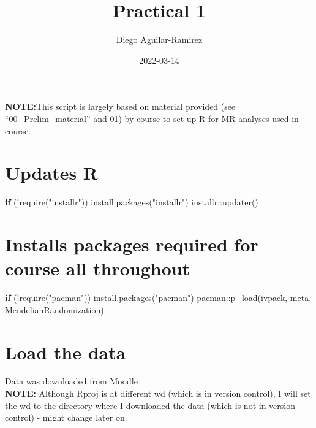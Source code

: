 \documentclass[
]{article}
\title{Practical 1}
\author{Diego Aguilar-Ramirez}
\date{2022-03-14}
\newenvironment{Shaded}{\begin{snugshade}}{\end{snugshade}}
\newcommand{\ControlFlowTok}[1]{\textcolor[rgb]{0.13,0.29,0.53}{\textbf{#1}}}
\newcommand{\FunctionTok}[1]{\textcolor[rgb]{0.00,0.00,0.00}{#1}}
\newcommand{\NormalTok}[1]{#1}
\newcommand{\SpecialCharTok}[1]{\textcolor[rgb]{0.00,0.00,0.00}{#1}}
\newcommand{\StringTok}[1]{\textcolor[rgb]{0.31,0.60,0.02}{#1}}
\begin{document}
\maketitle

\textbf{NOTE:}This script is largely based on material provided (see
``00\_Prelim\_material'' and 01) by course to set up R for MR analyses
used in course.

\hypertarget{updates-r}{%
\section{Updates R}\label{updates-r}}

\begin{Shaded}
\begin{Highlighting}[]
\ControlFlowTok{if}\NormalTok{ (}\SpecialCharTok{!}\FunctionTok{require}\NormalTok{(}\StringTok{"installr"}\NormalTok{)) }\FunctionTok{install.packages}\NormalTok{(}\StringTok{"installr"}\NormalTok{)}
\NormalTok{installr}\SpecialCharTok{::}\FunctionTok{updater}\NormalTok{()}
\end{Highlighting}
\end{Shaded}

\hypertarget{installs-packages-required-for-course-all-throughout}{%
\section{Installs packages required for course all
throughout}\label{installs-packages-required-for-course-all-throughout}}

\begin{Shaded}
\begin{Highlighting}[]
\ControlFlowTok{if}\NormalTok{ (}\SpecialCharTok{!}\FunctionTok{require}\NormalTok{(}\StringTok{"pacman"}\NormalTok{)) }\FunctionTok{install.packages}\NormalTok{(}\StringTok{"pacman"}\NormalTok{)}
\NormalTok{pacman}\SpecialCharTok{::}\FunctionTok{p\_load}\NormalTok{(ivpack, meta, MendelianRandomization)}
\end{Highlighting}
\end{Shaded}

\hypertarget{load-the-data}{%
\section{Load the data}\label{load-the-data}}

Data was downloaded from Moodle\\
\textbf{NOTE:} Although Rproj is at different wd (which is in version
control), I will set the wd to the directory where I downloaded the data
(which is not in version control) - might change later on.
\end{document}
